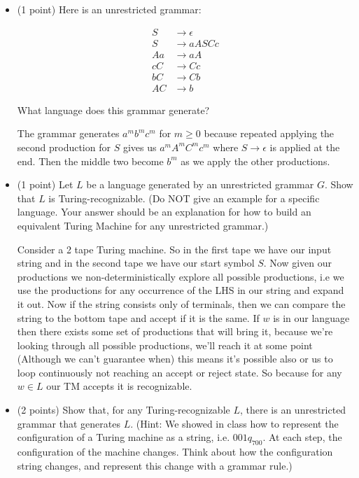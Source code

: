 \documentclass[11pt]{article}
\begin{document}
\begin{enumerate}
\begin{itemize}
\item (1 point) Here is an unrestricted grammar:

\begin{align*}
S & \rightarrow \epsilon\\
S & \rightarrow aASCc\\
Aa & \rightarrow aA\\
cC & \rightarrow Cc\\
bC & \rightarrow Cb\\
AC & \rightarrow b
\end{align*}

What language does this grammar generate? \\

\begin{answer}
    The grammar generates $a^{m}b^{m}c^{m}$ for $m \ge 0$ because repeated applying the second production for $S$ gives us $a^{m}A^{m}C^{m}c^{m}$ where $S \to \epsilon$ is applied at the end. Then the middle two become $b^{m}$ as we apply the other productions.
\end{answer}

\item (1 point) Let $L$ be a language generated by an unrestricted grammar $G$. Show that $L$ is Turing-recognizable. (Do NOT give an example for a specific language. Your answer should be an explanation for how to build an equivalent Turing Machine for any unrestricted grammar.) \\

\begin{answer}
    Consider a 2 tape Turing machine. So in the first tape we have our input string and in the second tape we have our start symbol $S$. Now given our productions we non-deterministically explore all possible productions, i.e we use the productions for any occurrence of the LHS in our string and expand it out.  Now if the string consists only of terminals, then we can compare the string to the bottom tape and accept if it is the same. If $w$ is in our language then there exists some set of productions that will bring it, because we're looking through all possible productions, we'll reach it at some point (Although we can't guarantee when) this means it's possible also or us to loop continuously not reaching an accept or reject state. So because for any $w \in L$ our TM accepts it is recognizable.
\end{answer}


\item (2 points) Show that, for any Turing-recognizable $L$, there is an unrestricted grammar that generates $L$. (Hint: We showed in class how to represent the configuration of a Turing machine as a string, i.e. $001q_700$. At each step, the configuration of the machine changes. Think about how the configuration string changes, and represent this change with a grammar rule.) \\


\end{itemize}
\end{enumerate}
\end{document}
